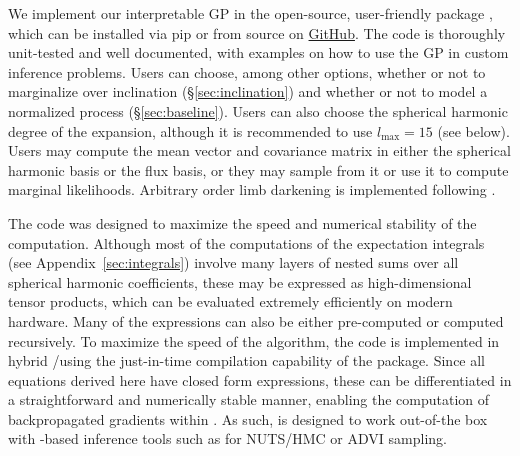 \documentclass[modern]{aastex62}
\begin{document}
We implement our interpretable GP in the open-source, user-friendly
\Python package \starryprocess, which can be installed via \textsf{pip}\xspace
or from source on \href{https://github.com/rodluger/starry_process}{GitHub}.
The code is thoroughly unit-tested and well documented, with examples on how
to use the GP in custom inference problems. Users can choose, among other
options, whether or not
to marginalize over inclination (\S\ref{sec:inclination}) and
whether or not to model a normalized
process (\S\ref{sec:baseline}). Users can also choose the spherical harmonic
degree of the expansion, although it is recommended to use $l_\mathrm{max} = 15$
(see below).
Users may compute the mean vector and covariance matrix in either the spherical
harmonic basis or the flux basis, or they may sample from it or use it to
compute marginal likelihoods.
Arbitrary order limb darkening is implemented following
\citet{Agol2020}.

The code was designed to maximize the speed and numerical stability of the
computation. Although most of the computations of the expectation integrals
(see Appendix~\ref{sec:integrals}) involve many layers of nested sums over
all spherical harmonic coefficients, these may be expressed as high-dimensional
tensor products, which can be evaluated extremely efficiently on modern
hardware. Many of the expressions can also be either pre-computed or
computed recursively. To maximize the speed of the algorithm, the code is
implemented in hybrid \cpp/\Python using the just-in-time compilation
capability of the \theano package. Since all equations derived here
have closed form expressions, these can be differentiated in a straightforward
and numerically stable manner, enabling the computation of backpropagated
gradients within \theano. As such, \starryprocess is designed to work
out-of-the box with \theano-based inference tools such as \pymcthree
for NUTS/HMC or ADVI sampling.
\end{document}
